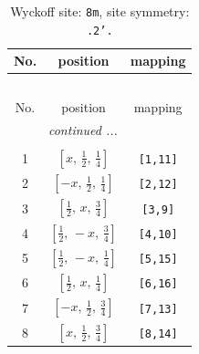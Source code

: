\documentclass[fleqn,8pt]{jsarticle}
\begin{document}
\begin{longtable}{ccc}
\caption{Wyckoff site: {\tt 8m}, site symmetry: {\tt .2'.}}
 \\
 \hline \hline
No. & position & mapping \\ \hline \endfirsthead

\multicolumn{2}{l}{\tablename\ \thetable{}} \\
 \hline \hline
No. & position & mapping \\ \hline \endhead

 \hline \hline
\multicolumn{2}{r}{\footnotesize\it continued ...} \\ \endfoot

 \hline \hline
\multicolumn{2}{r}{} \\ \endlastfoot

1 & $\left[ x,\, \frac{1}{2},\, \frac{1}{4} \right]$ & {\tt [1,11]} \\ \hline
2 & $\left[ - x,\, \frac{1}{2},\, \frac{1}{4} \right]$ & {\tt [2,12]} \\ \hline
3 & $\left[ \frac{1}{2},\, x,\, \frac{3}{4} \right]$ & {\tt [3,9]} \\ \hline
4 & $\left[ \frac{1}{2},\, - x,\, \frac{3}{4} \right]$ & {\tt [4,10]} \\ \hline
5 & $\left[ \frac{1}{2},\, - x,\, \frac{1}{4} \right]$ & {\tt [5,15]} \\ \hline
6 & $\left[ \frac{1}{2},\, x,\, \frac{1}{4} \right]$ & {\tt [6,16]} \\ \hline
7 & $\left[ - x,\, \frac{1}{2},\, \frac{3}{4} \right]$ & {\tt [7,13]} \\ \hline
8 & $\left[ x,\, \frac{1}{2},\, \frac{3}{4} \right]$ & {\tt [8,14]} \\
\end{longtable}
\renewcommand{\arraystretch}{1.2}
\end{document}
